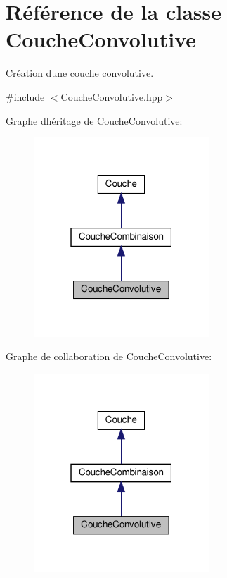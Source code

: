 \hypertarget{classCoucheConvolutive}{}\section{Référence de la classe Couche\+Convolutive}
\label{classCoucheConvolutive}


Création d\textquotesingle{}une couche convolutive.  




{\ttfamily \#include $<$Couche\+Convolutive.\+hpp$>$}



Graphe d\textquotesingle{}héritage de Couche\+Convolutive\+:
\nopagebreak
\begin{figure}[H]
\begin{center}
\leavevmode
\includegraphics[width=187pt]{classCoucheConvolutive__inherit__graph}
\end{center}
\end{figure}


Graphe de collaboration de Couche\+Convolutive\+:
\nopagebreak
\begin{figure}[H]
\begin{center}
\leavevmode
\includegraphics[width=187pt]{classCoucheConvolutive__coll__graph}
\end{center}
\end{figure}
